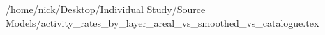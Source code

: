 /home/nick/Desktop/Individual Study/Source Models/activity_rates_by_layer_areal_vs_smoothed_vs_catalogue.tex